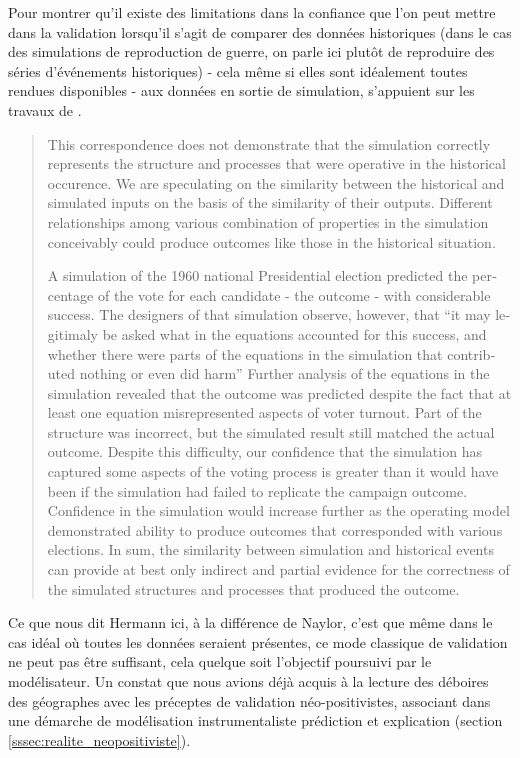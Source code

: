 Pour montrer qu'il existe des limitations dans la confiance que l'on peut mettre dans la validation lorsqu'il s'agit de comparer des données historiques (dans le cas des simulations de reproduction de guerre, on parle ici plutôt de reproduire des séries d'événements historiques) - cela même si elles sont idéalement toutes rendues disponibles - aux données en sortie de simulation, \textcite{Hermann1967b} s'appuient sur les travaux de \textcite{Pool1965}.

\foreignblockquote{english}[\cite{Pool1965}]{This correspondence does not demonstrate that the simulation correctly represents the structure and processes that were operative in the historical occurence. We are speculating on the similarity between the historical and simulated inputs on the basis of the similarity of their outputs. Different relationships among various combination of properties in the simulation conceivably could produce outcomes like those in the historical situation.

A simulation of the 1960 national Presidential election predicted the percentage of the vote for each candidate - the outcome - with considerable success. The designers of that simulation observe, however, that \enquote{it may legitimaly be asked what in the equations accounted for this success, and whether there were parts of the equations in the simulation that contributed nothing or even did harm} Further analysis of the equations in the simulation revealed that the outcome was predicted despite the fact that at least one equation misrepresented aspects of voter turnout. Part of the structure was incorrect, but the simulated result still matched the actual outcome. Despite this difficulty, our confidence that the simulation has captured some aspects of the voting process is greater than it would have been if the simulation had failed to replicate the campaign outcome. Confidence in the simulation would increase further as the operating model demonstrated ability to produce outcomes that corresponded with various elections. In sum, the similarity between simulation and historical events can provide at best only indirect and partial evidence for the correctness of the simulated structures and processes that produced the outcome.}

Ce que nous dit Hermann ici, à la différence de Naylor, c'est que même dans le cas idéal où toutes les données seraient présentes, ce mode classique de validation ne peut pas être suffisant, cela quelque soit l'objectif poursuivi par le modélisateur. Un constat que nous avions déjà acquis à la lecture des déboires des géographes avec les préceptes de validation néo-positivistes, associant dans une démarche de modélisation instrumentaliste prédiction et explication (section \ref{sssec:realite_neopositiviste}).

